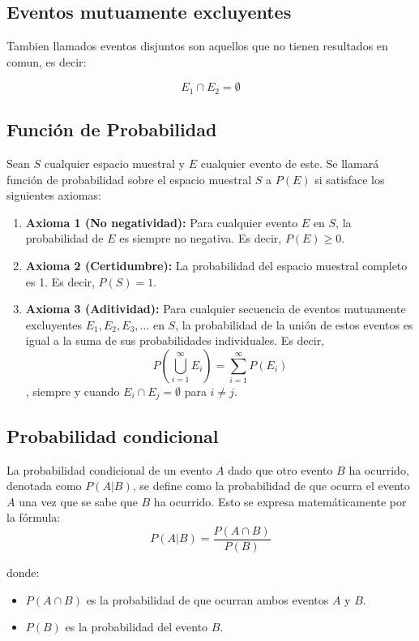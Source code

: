 \documentclass{article}
\begin{document}
\vspace{.25cm}

\subsection{Eventos mutuamente excluyentes}

Tambien llamados eventos disjuntos son aquellos que no tienen resultados en comun, es decir:

\[E_1 \cap E_2 = \emptyset\]

\subsection{Función de Probabilidad}

Sean \( S \) cualquier espacio muestral y \( E \) cualquier evento de este. Se llamará función de probabilidad sobre el espacio muestral \( S \) a \( P(E) \) si satisface los siguientes axiomas:

\begin{enumerate}
    \item \textbf{Axioma 1 (No negatividad):} Para cualquier evento \( E \) en \( S \), la probabilidad de \( E \) es siempre no negativa. Es decir, \( P(E) \geq 0 \).
    \item \textbf{Axioma 2 (Certidumbre):} La probabilidad del espacio muestral completo es 1. Es decir, \( P(S) = 1 \).
    \item \textbf{Axioma 3 (Aditividad):} Para cualquier secuencia de eventos mutuamente excluyentes \( E_1, E_2, E_3, \ldots \) en \( S \), la probabilidad de la unión de estos eventos es igual a la suma de sus probabilidades individuales. Es decir,
          \[ P\left(\bigcup_{i=1}^{\infty} E_i\right) = \sum_{i=1}^{\infty} P(E_i) \],
          siempre y cuando \( E_i \cap E_j = \emptyset \) para \( i \neq j \).
\end{enumerate}

\subsection{Probabilidad condicional}

La probabilidad condicional de un evento \( A \) dado que otro evento \( B \) ha ocurrido, denotada como \( P(A|B) \), se define como la probabilidad de que ocurra el evento \( A \) una vez que se sabe que \( B \) ha ocurrido. Esto se expresa matemáticamente por la fórmula:
\[ P(A|B) = \frac{P(A \cap B)}{P(B)} \]

donde:
\begin{itemize}
    \item \( P(A \cap B) \) es la probabilidad de que ocurran ambos eventos \( A \) y \( B \).
    \item \( P(B) \) es la probabilidad del evento \( B \).
\end{itemize}
\end{document}
